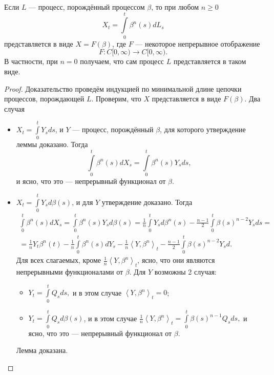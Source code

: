 \documentclass[12pt, a4paper, titlepage]{article}
\begin{document}
\begin{comment}
 \begin{remark}
 Все процессы, порождённые процессом $\beta$, являются
 непрерывными семимартингалами относительно фильтрации, 
 порождённой процессом $\beta$.
\end{remark}
\end{comment}

\begin{lem}\label{WienerCalculusLem}
 Если $L$ --- процесс, порождённый процессом $\beta$, то
при любом $n \ge 0$
$$X_t=\int\limits_0^t \beta^n(s)dL_s$$
представляется в виде $X=F(\beta)$,
где $F$ --- некоторое непрерывное отображение
$$F \colon C[0, \infty) \to C[0, \infty).$$
В частности, при $n=0$ получаем, что сам процесс $L$ представляется
в таком виде. 
\end{lem}
\begin{proof}
 Доказательство проведём индукцией по минимальной длине цепочки процессов, порождающей $L$. 
Проверим, что $X$ представляется в виде $F(\beta)$. Два случая
\begin{itemize}
 \item $X_t = \int\limits_0^t Y_s ds$, и $Y$ --- процесс, порождённый $\beta$,
 для которого утверждение леммы доказано. Тогда
$$\int\limits_0^t \beta^n(s)dX_s = \int\limits_0^t \beta^n(s) Y_s ds,$$
и ясно, что это --- непрерывный функционал от $\beta$. 
 \item $X_t = \int\limits_0^t Y_s d\beta(s)$, и для $Y$ утверждение доказано. Тогда
\begin{multline*}
 \int\limits_0^t \beta^n(s)dX_s = \int\limits_0^t \beta^n(s) Y_s d\beta(s)=
 \frac{1}{n}\int\limits_0^t Y_s d\beta^n(s)-\frac{n-1}{2}\int\limits_0^t \beta(s)^{n-2} Y_s ds=\\=
 \frac{1}{n}Y_t \beta^n(t)-\frac{1}{n}\int\limits_0^t \beta^n(s)dY_s-
 \frac{1}{n}\left<Y, \beta^n\right>_t-
 \frac{n-1}{2}\int\limits_0^t \beta(s)^{n-2} Y_s d.
\end{multline*}
Для всех слагаемых, кроме $\frac{1}{n}\left<Y, \beta^n\right>_t$, ясно, что они являются непрерывными 
функционалами от $\beta$. Для $Y$ возможны 2 случая: 
\begin{itemize}
\item $Y_t=\int\limits_0^t Q_s ds,$ и в этом случае 
$\left<Y, \beta^n\right>_t=0$; 
\item $Y_t=\int\limits_0^t Q_s d\beta(s)$,
и в этом случае 
$\frac{1}{n}\left<Y, \beta^n\right>_t=\int\limits_0^t \beta(s)^{n-1}Q_s ds,$
и ясно, что это --- непрерывный функционал от $\beta$. 
\end{itemize}
Лемма доказана. 
\end{itemize}
\end{proof}
\end{document}

